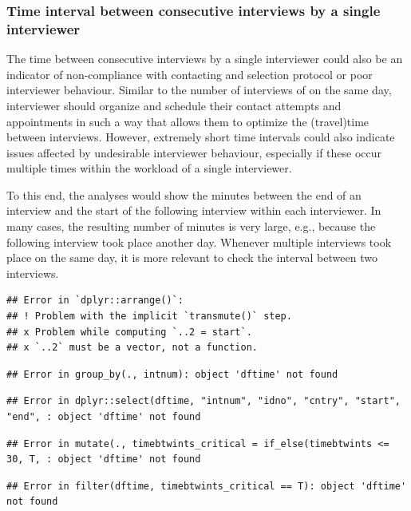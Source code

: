\documentclass[
  11pt,
  a4paperpaper,
]{article}
\begin{document}
\hypertarget{sec:interval}{%
\subsubsection{Time interval between consecutive interviews by a single
interviewer}\label{sec:interval}}

The time between consecutive interviews by a single interviewer could
also be an indicator of non-compliance with contacting and selection
protocol or poor interviewer behaviour. Similar to the number of
interviews of on the same day, interviewer should organize and schedule
their contact attempts and appointments in such a way that allows them
to optimize the (travel)time between interviews. However, extremely
short time intervals could also indicate issues affected by undesirable
interviewer behaviour, especially if these occur multiple times within
the workload of a single interviewer.

To this end, the analyses would show the minutes between the end of an
interview and the start of the following interview within each
interviewer. In many cases, the resulting number of minutes is very
large, e.g., because the following interview took place another day.
Whenever multiple interviews took place on the same day, it is more
relevant to check the interval between two interviews.

\begin{verbatim}
## Error in `dplyr::arrange()`:
## ! Problem with the implicit `transmute()` step.
## x Problem while computing `..2 = start`.
## x `..2` must be a vector, not a function.
\end{verbatim}

\begin{verbatim}
## Error in group_by(., intnum): object 'dftime' not found
\end{verbatim}

\begin{verbatim}
## Error in dplyr::select(dftime, "intnum", "idno", "cntry", "start", "end", : object 'dftime' not found
\end{verbatim}

\begin{verbatim}
## Error in mutate(., timebtwints_critical = if_else(timebtwints <= 30, T, : object 'dftime' not found
\end{verbatim}

\begin{verbatim}
## Error in filter(dftime, timebtwints_critical == T): object 'dftime' not found
\end{verbatim}
\end{document}
